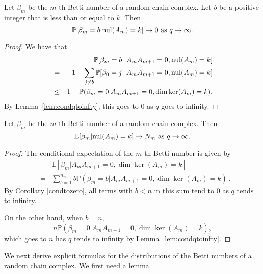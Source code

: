 \begin{corollary}\label{condtozero}
Let $\beta_m$ be the $m$-th Betti number of a random chain complex. Let $b$ be a positive integer that is less than or equal to $k$. Then 
\[
\mathbb{P}[\beta_m = b| \mathrm{nul}(A_{m}) = k ] \to 0 \textrm{ as } q\to\infty.
\]
\end{corollary}
\begin{proof}
We have that
	\begin{eqnarray*}
	&&\mathbb{P}[\beta_m = b \,|\, A_{m}A_{m+1} = 0, \mathrm{nul}(A_{m}) = k ]\\
    &=& 1 - \sum_{j\neq b}\mathbb{P}[\beta_0 = j \,|\, A_{m}A_{m+1} = 0, \mathrm{nul}(A_{m}) = k ]\\
    &\leq& 1 - \mathbb{P}(\beta_m = 0|A_{m}A_{m+1} = 0, \dim\ker(A_{m}) = k ).
	\end{eqnarray*}
By Lemma~\ref{lem:condqtoinfty}, this goes to $0$ as $q$ goes to infinity.
\end{proof}

\begin{corollary}
Let $\beta_m$ be the $m$-th Betti number of a random chain complex.  Then 
\[
\mathbb{E}[\beta_m | \mathrm{nul}(A_{m}) = k ] \to  N_m\textrm{ as } q\to\infty.
\]
\begin{proof}
The conditional expectation of the $m$-th Betti number is given by
	\begin{eqnarray*}
	& & \mathbb{E}[\beta_m | A_{m}A_{m+1} = 0, \dim\ker(A_{m}) = k ]\\
	&=& \sum_{b=1}^{n_m} b \mathbb{P}(\beta_m = b | A_{m}A_{m+1} = 0, \dim\ker(A_{m}) = k ) \, .
	\end{eqnarray*}
By Corollary \ref{condtozero}, all terms with $b< n$ in this sum tend to 
$0$ as $q$ tends to infinity. 

On the other hand, when $b=n$, 
\[
n\mathbb{P}(\beta_m=0| A_{m}A_{m+1} = 0, \dim\ker(A_{m}) = k ),
\]
which goes to $n$ has $q$ tends to infinity by Lemma~\ref{lem:condqtoinfty}.
\end{proof}
\end{corollary}

We next derive explicit formulas for the distributions of the Betti numbers of a random chain complex. We first need a lemma

